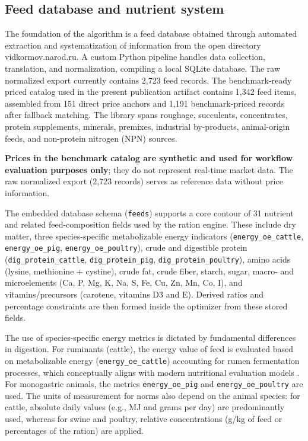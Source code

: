 \documentclass[a4paper,fleqn]{cas-dc}
\begin{document}
\subsection{Feed database and nutrient system}\label{subsec:database}

The foundation of the algorithm is a feed database obtained through automated extraction and systematization of information from the open directory vidkormov.narod.ru. A custom Python pipeline handles data collection, translation, and normalization, compiling a local SQLite database. The raw normalized export currently contains 2,723 feed records. The benchmark-ready priced catalog used in the present publication artifact contains 1,342 feed items, assembled from 151 direct price anchors and 1,191 benchmark-priced records after fallback matching. The library spans roughage, succulents, concentrates, protein supplements, minerals, premixes, industrial by-products, animal-origin feeds, and non-protein nitrogen (NPN) sources.

\textbf{Prices in the benchmark catalog are synthetic and used for workflow evaluation purposes only}; they do not represent real-time market data. The raw normalized export (2,723 records) serves as reference data without price information.

The embedded database schema (\texttt{feeds}) supports a core contour of 31 nutrient and related feed-composition fields used by the ration engine. These include dry matter, three species-specific metabolizable energy indicators (\texttt{energy\_oe\_cattle}, \texttt{energy\_oe\_pig}, \texttt{energy\_oe\_poultry}), crude and digestible protein (\texttt{dig\_protein\_cattle}, \texttt{dig\_protein\_pig}, \texttt{dig\_protein\_poultry}), amino acids (lysine, methionine + cystine), crude fat, crude fiber, starch, sugar, macro- and microelements (Ca, P, Mg, K, Na, S, Fe, Cu, Zn, Mn, Co, I), and vitamins/precursors (carotene, vitamins D3 and E). Derived ratios and percentage constraints are then formed inside the optimizer from these stored fields.

The use of species-specific energy metrics is dictated by fundamental differences in digestion. For ruminants (cattle), the energy value of feed is evaluated based on metabolizable energy (\texttt{energy\_oe\_cattle}) accounting for rumen fermentation processes, which conceptually aligns with modern nutritional evaluation models \citep{sauvant2018, nASEM2021}. For monogastric animals, the metrics \texttt{energy\_oe\_pig} and \texttt{energy\_oe\_poultry} are used. The units of measurement for norms also depend on the animal species: for cattle, absolute daily values (e.g., MJ and grams per day) are predominantly used, whereas for swine and poultry, relative concentrations (g/kg of feed or percentages of the ration) are applied.
\end{document}
